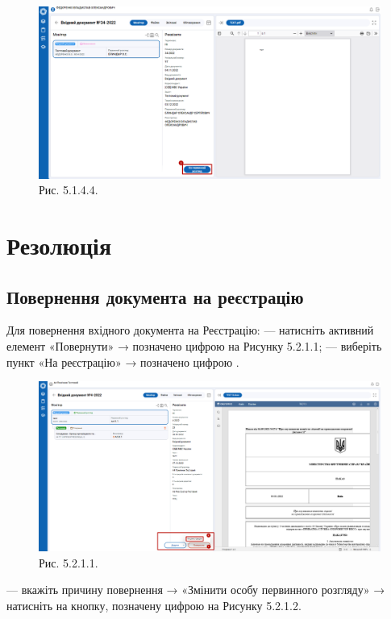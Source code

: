\begin{figure}[!htbp]
\centerline{\includegraphics[width=\textwidth]{img/5.1.4.4.png}}
\caption{Рис. 5.1.4.4. }
\end{figure}

\section{Резолюція}

\subsection{Повернення документа на реєстрацію}

Для повернення вхідного документа на Реєстрацію:
--- натисніть активний елемент «Повернути» → позначено цифрою  на Рисунку 5.2.1.1;
--- виберіть пункт «На реєстрацію» → позначено цифрою .

\begin{figure}[!htbp]
\centerline{\includegraphics[width=\textwidth]{img/5.2.1.1.png}}
\caption{Рис. 5.2.1.1. }
\end{figure}

--- вкажіть причину повернення →  «Змінити особу первинного розгляду» →
натисніть на кнопку, позначену цифрою  на Рисунку 5.2.1.2.

